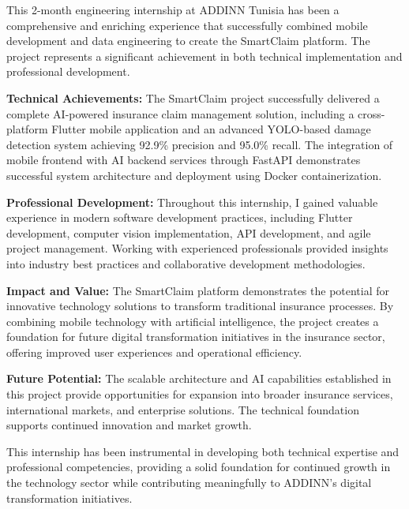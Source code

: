 \documentclass[12pt,a4paper]{report}
\begin{document}
This 2-month engineering internship at ADDINN Tunisia has been a comprehensive and enriching experience that successfully combined mobile development and data engineering to create the SmartClaim platform. The project represents a significant achievement in both technical implementation and professional development.

\textbf{Technical Achievements:} The SmartClaim project successfully delivered a complete AI-powered insurance claim management solution, including a cross-platform Flutter mobile application and an advanced YOLO-based damage detection system achieving 92.9\% precision and 95.0\% recall. The integration of mobile frontend with AI backend services through FastAPI demonstrates successful system architecture and deployment using Docker containerization.

\textbf{Professional Development:} Throughout this internship, I gained valuable experience in modern software development practices, including Flutter development, computer vision implementation, API development, and agile project management. Working with experienced professionals provided insights into industry best practices and collaborative development methodologies.

\textbf{Impact and Value:} The SmartClaim platform demonstrates the potential for innovative technology solutions to transform traditional insurance processes. By combining mobile technology with artificial intelligence, the project creates a foundation for future digital transformation initiatives in the insurance sector, offering improved user experiences and operational efficiency.

\textbf{Future Potential:} The scalable architecture and AI capabilities established in this project provide opportunities for expansion into broader insurance services, international markets, and enterprise solutions. The technical foundation supports continued innovation and market growth.

This internship has been instrumental in developing both technical expertise and professional competencies, providing a solid foundation for continued growth in the technology sector while contributing meaningfully to ADDINN's digital transformation initiatives.

\clearpage
\newpage


\end{document}
